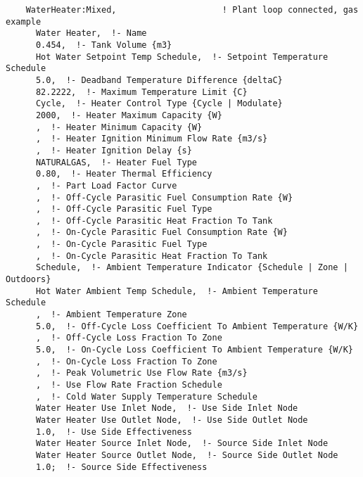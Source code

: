 \begin{lstlisting}
    WaterHeater:Mixed,                     ! Plant loop connected, gas example
      Water Heater,  !- Name
      0.454,  !- Tank Volume {m3}
      Hot Water Setpoint Temp Schedule,  !- Setpoint Temperature Schedule
      5.0,  !- Deadband Temperature Difference {deltaC}
      82.2222,  !- Maximum Temperature Limit {C}
      Cycle,  !- Heater Control Type {Cycle | Modulate}
      2000,  !- Heater Maximum Capacity {W}
      ,  !- Heater Minimum Capacity {W}
      ,  !- Heater Ignition Minimum Flow Rate {m3/s}
      ,  !- Heater Ignition Delay {s}
      NATURALGAS,  !- Heater Fuel Type
      0.80,  !- Heater Thermal Efficiency
      ,  !- Part Load Factor Curve
      ,  !- Off-Cycle Parasitic Fuel Consumption Rate {W}
      ,  !- Off-Cycle Parasitic Fuel Type
      ,  !- Off-Cycle Parasitic Heat Fraction To Tank
      ,  !- On-Cycle Parasitic Fuel Consumption Rate {W}
      ,  !- On-Cycle Parasitic Fuel Type
      ,  !- On-Cycle Parasitic Heat Fraction To Tank
      Schedule,  !- Ambient Temperature Indicator {Schedule | Zone | Outdoors}
      Hot Water Ambient Temp Schedule,  !- Ambient Temperature Schedule
      ,  !- Ambient Temperature Zone
      5.0,  !- Off-Cycle Loss Coefficient To Ambient Temperature {W/K}
      ,  !- Off-Cycle Loss Fraction To Zone
      5.0,  !- On-Cycle Loss Coefficient To Ambient Temperature {W/K}
      ,  !- On-Cycle Loss Fraction To Zone
      ,  !- Peak Volumetric Use Flow Rate {m3/s}
      ,  !- Use Flow Rate Fraction Schedule
      ,  !- Cold Water Supply Temperature Schedule
      Water Heater Use Inlet Node,  !- Use Side Inlet Node
      Water Heater Use Outlet Node,  !- Use Side Outlet Node
      1.0,  !- Use Side Effectiveness
      Water Heater Source Inlet Node,  !- Source Side Inlet Node
      Water Heater Source Outlet Node,  !- Source Side Outlet Node
      1.0;  !- Source Side Effectiveness



\end{lstlisting}
